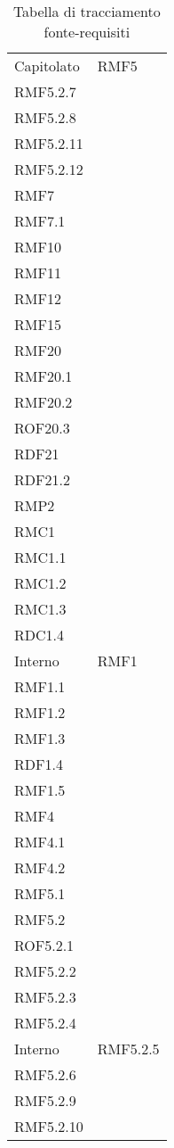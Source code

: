 \setlength{\tabcolsep}{10pt}
\begin{longtable}[h!] { >{\centering}m{5cm} >{\centering}m{5cm} }
	\caption{Tabella di tracciamento fonte-requisiti} \\
	\rowcolor{lightgray}
	\thead{Fonte} & \thead{Requisiti} \\ \endhead%
	
	Capitolato & RMF5 \\
	 RMF5.2.7 \\
	 RMF5.2.8 \\
	 RMF5.2.11 \\
	 RMF5.2.12 \\
	 RMF7 \\
	 RMF7.1 \\
	 RMF10 \\
	 RMF11 \\
	 RMF12 \\
	 RMF15 \\
	 RMF20 \\
	 RMF20.1 \\
	 RMF20.2 \\
	 ROF20.3 \\
	 RDF21 \\
	 RDF21.2 \\
	 RMP2 \\
	 RMC1 \\
	 RMC1.1 \\
	 RMC1.2 \\
	 RMC1.3 \\
	 RDC1.4
	 \tabularnewline
	 Interno & RMF1 \\
	 RMF1.1 \\
	 RMF1.2 \\
	 RMF1.3 \\
	 RDF1.4 \\
	 RMF1.5 \\
	 RMF4 \\
	 RMF4.1 \\
	 RMF4.2 \\
	 RMF5.1 \\
	 RMF5.2 \\
	 ROF5.2.1 \\
	 RMF5.2.2 \\
	 RMF5.2.3 \\
	 RMF5.2.4 
	 \tabularnewline
	 Interno & RMF5.2.5 \\ 
	 RMF5.2.6 \\
	 RMF5.2.9 \\
	 RMF5.2.10 \\

\end{longtable}
